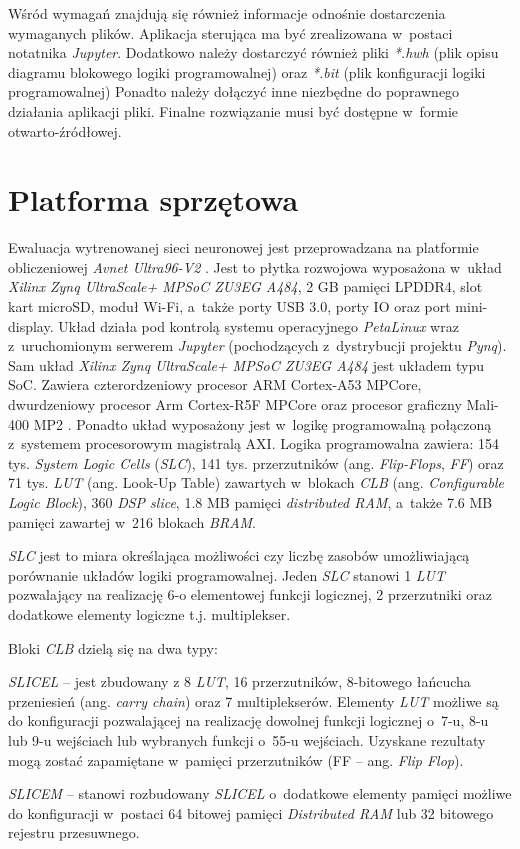 Wśród wymagań znajdują się również informacje odnośnie dostarczenia wymaganych plików.
Aplikacja sterująca ma być zrealizowana w~postaci notatnika \emph{Jupyter}.
Dodatkowo należy dostarczyć również pliki \emph{*.hwh} (plik opisu diagramu blokowego logiki programowalnej)
oraz \emph{*.bit} (plik konfiguracji logiki programowalnej) Ponadto należy dołączyć inne niezbędne do poprawnego działania aplikacji pliki. 
Finalne rozwiązanie musi być dostępne w~formie otwarto-źródłowej.

\section{Platforma sprzętowa}
Ewaluacja wytrenowanej sieci neuronowej jest przeprowadzana na platformie obliczeniowej \emph{Avnet Ultra96-V2} \cite{avnet_ultra96}. 
Jest to płytka rozwojowa wyposażona w~układ \emph{Xilinx Zynq UltraScale+ MPSoC ZU3EG A484}, 2 GB pamięci LPDDR4, slot kart microSD, moduł Wi-Fi, a~także porty USB 3.0, porty IO oraz port mini-display. 
Układ działa pod kontrolą systemu operacyjnego \emph{PetaLinux} wraz z~uruchomionym serwerem \emph{Jupyter} (pochodzących z~dystrybucji projektu \emph{Pynq}\cite{pynq}). 
Sam układ \emph{Xilinx Zynq UltraScale+ MPSoC ZU3EG A484} jest układem typu SoC. 
Zawiera czterordzeniowy procesor ARM Cortex-A53 MPCore, dwurdzeniowy procesor Arm Cortex-R5F MPCore oraz procesor graficzny Mali-400 MP2 \cite{zynq_product_guide}. 
Ponadto układ wyposażony jest w~logikę programowalną połączoną z~systemem procesorowym magistralą AXI. 
Logika programowalna zawiera: 
154 tys. \emph{System Logic Cells} (\emph{SLC}), 
141 tys. przerzutników (ang. \emph{Flip-Flops}, \emph{FF}) 
oraz 71 tys. \emph{LUT} (ang. Look-Up Table) zawartych w~blokach \emph{CLB} (ang. \emph{Configurable Logic Block}), 360 \emph{DSP slice}, 1.8 MB pamięci \emph{distributed RAM}, a~także 7.6 MB pamięci zawartej w~216 blokach \emph{BRAM}. 

\emph{SLC} jest to miara określająca możliwości czy liczbę zasobów umożliwiającą porównanie układów logiki programowalnej.
Jeden \emph{SLC} stanowi 1 \emph{LUT} pozwalający na realizację 6-o elementowej funkcji logicznej, 2 przerzutniki oraz dodatkowe elementy logiczne t.j. multiplekser. 

Bloki \emph{CLB} \cite{clb} dzielą się na dwa typy:
\begin{description}
\item \emph{SLICEL} -- jest zbudowany z 8 \emph{LUT}, 16 przerzutników, 8-bitowego łańcucha przeniesień (ang. \emph{carry chain}) oraz 7 multiplekserów. 
Elementy \emph{LUT} możliwe są do konfiguracji pozwalającej na realizację dowolnej funkcji logicznej o~7-u, 8-u lub 9-u wejściach lub wybranych funkcji o~55-u wejściach. 
Uzyskane rezultaty mogą zostać zapamiętane w~pamięci przerzutników (FF -- ang. \textit{Flip Flop}).
\item \emph{SLICEM} -- stanowi rozbudowany \emph{SLICEL} o~dodatkowe elementy pamięci możliwe do konfiguracji w~postaci 64 bitowej pamięci \emph{Distributed RAM} lub 32 bitowego rejestru przesuwnego. 
\end{description}

